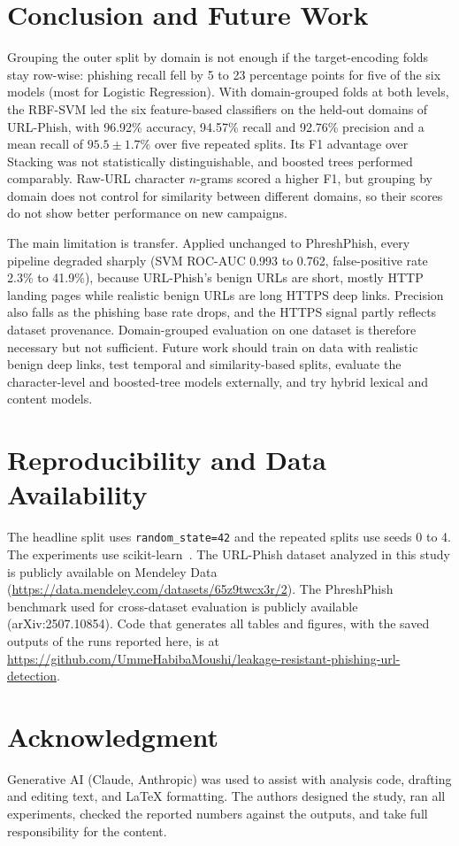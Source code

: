 \documentclass[conference]{IEEEtran}
\begin{document}
\section{Conclusion and Future Work}
Grouping the outer split by domain is not enough if the target-encoding folds stay row-wise: phishing recall fell by 5 to 23 percentage points for five of the six models (most for Logistic Regression). With domain-grouped folds at both levels, the RBF-SVM led the six feature-based classifiers on the held-out domains of URL-Phish, with 96.92\% accuracy, 94.57\% recall and 92.76\% precision and a mean recall of $95.5\pm1.7\%$ over five repeated splits. Its F1 advantage over Stacking was not statistically distinguishable, and boosted trees performed comparably. Raw-URL character $n$-grams scored a higher F1, but grouping by domain does not control for similarity between different domains, so their scores do not show better performance on new campaigns.

The main limitation is transfer. Applied unchanged to PhreshPhish, every pipeline degraded sharply (SVM ROC-AUC 0.993 to 0.762, false-positive rate 2.3\% to 41.9\%), because URL-Phish's benign URLs are short, mostly HTTP landing pages while realistic benign URLs are long HTTPS deep links. Precision also falls as the phishing base rate drops, and the HTTPS signal partly reflects dataset provenance. Domain-grouped evaluation on one dataset is therefore necessary but not sufficient. Future work should train on data with realistic benign deep links, test temporal and similarity-based splits, evaluate the character-level and boosted-tree models externally, and try hybrid lexical and content models.

\section*{Reproducibility and Data Availability}
The headline split uses \texttt{random\_state=42} and the repeated splits use seeds 0 to 4. The experiments use scikit-learn~\cite{pedregosa2011}.
The URL-Phish dataset analyzed in this study is publicly available on Mendeley Data~\cite{linh2026} (\url{https://data.mendeley.com/datasets/65z9twcx3r/2}).
The PhreshPhish benchmark used for cross-dataset evaluation is publicly available~\cite{dalton2025} (arXiv:2507.10854).
Code that generates all tables and figures, with the saved outputs of the runs reported here, is at \url{https://github.com/UmmeHabibaMoushi/leakage-resistant-phishing-url-detection}.

\section*{Acknowledgment}
Generative AI (Claude, Anthropic) was used to assist with analysis code, drafting and editing text, and LaTeX formatting. The authors designed the study, ran all experiments, checked the reported numbers against the outputs, and take full responsibility for the content.



\end{document}
